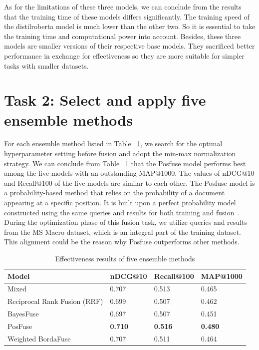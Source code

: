 \documentclass[acmsmall]{acmart}
\begin{document}
As for the limitations of these three models, we can conclude from the results that the training time of these models differs significantly. The training speed of the distilroberta model is much lower than the other two. So it is essential to take the training time and computational power into account. Besides, these three models are smaller versions of their respective base models. They sacrificed better performance in exchange for effectiveness so they are more suitable for simpler tasks with smaller datasets.

\section{Task 2: Select and apply five ensemble methods}
For each ensemble method listed in Table ~\ref{tab:results-task2}, we search for the optimal hyperparameter setting before fusion and adopt the min-max normalization strategy. We can conclude from Table ~\ref{tab:results-task2} that the Posfuse model performs best among the five models with an outstanding MAP@1000. The values of nDCG@10 and Recall@100 of the five models are similar to each other. The Posfuse model is a probability-based method that relies on the probability of a document appearing at a specific position. It is built upon a perfect probability model constructed using the same queries and results for both training and fusion~\cite{DBLP:conf/sigir/LillisZTCLD10}. During the optimization phase of this fusion task, we utilize queries and results from the MS Macro dataset, which is an integral part of the training dataset. This alignment could be the reason why Posfuse outperforms other methods.

\begin{table}[!ht]
    \centering
    \caption{Effectiveness results of five ensemble methods}
    \label{tab:results-task2}
    \begin{tabular}{llll}
       \toprule
       \textbf{Model} &  \textbf{nDCG@10} & \textbf{Recall@100} & \textbf{MAP@1000}\\
       \midrule
       Mixed & 0.707 & 0.513 & 0.465\\
       Reciprocal Rank Fusion (RRF) & 0.699 & 0.507 & 0.462\\
       BayesFuse & 0.697 & 0.507 & 0.451\\
       PosFuse & \textbf{0.710} & \textbf{0.516} & \textbf{0.480}\\
       Weighted BordaFuse & 0.707 & 0.511 & 0.464\\
       \bottomrule
    \end{tabular}
\end{table}
\end{document}

